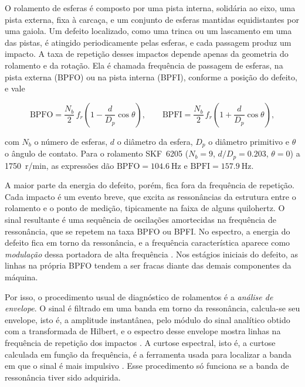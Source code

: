 O rolamento de esferas é composto por uma pista interna, solidária ao eixo, uma pista externa, fixa à carcaça,
e um conjunto de esferas mantidas equidistantes por uma gaiola. Um defeito localizado, como uma trinca ou um
lascamento em uma das pistas, é atingido periodicamente pelas esferas, e cada passagem produz um impacto. A taxa
de repetição desses impactos depende apenas da geometria do rolamento e da rotação. Ela é chamada frequência de
passagem de esferas, na pista externa (BPFO) ou na pista interna (BPFI), conforme a posição do defeito, e vale
\cite{randall2011}

\begin{equation}
\mathrm{BPFO} = \frac{N_b}{2}\, f_r \left(1 - \frac{d}{D_p}\cos\theta\right),
\qquad
\mathrm{BPFI} = \frac{N_b}{2}\, f_r \left(1 + \frac{d}{D_p}\cos\theta\right),
\label{eq:fund-bpfo}
\end{equation}

\noindent
com $N_b$ o número de esferas, $d$ o diâmetro da esfera, $D_p$ o diâmetro primitivo e $\theta$ o ângulo de
contato. Para o rolamento SKF~6205 ($N_b = 9$, $d/D_p = \num{0,203}$, $\theta = 0$) a \SI{1750}{r/min}, as
expressões dão $\mathrm{BPFO} = \SI{104,6}{\hertz}$ e $\mathrm{BPFI} = \SI{157,9}{\hertz}$.

A maior parte da energia do defeito, porém, fica fora da frequência de repetição. Cada impacto é um evento breve,
que excita as ressonâncias da estrutura entre o rolamento e o ponto de medição, tipicamente na faixa de alguns
quilohertz. O sinal resultante é uma sequência de oscilações amortecidas na frequência de ressonância, que se
repetem na taxa BPFO ou BPFI. No espectro, a energia do defeito fica em torno da ressonância, e a frequência
característica aparece como \emph{modulação} dessa portadora de alta frequência \cite{randall2011}. Nos estágios
iniciais do defeito, as linhas na própria BPFO tendem a ser fracas diante das demais componentes da máquina.

Por isso, o procedimento usual de diagnóstico de rolamentos é a \emph{análise de envelope}. O sinal é filtrado em
uma banda em torno da ressonância, calcula-se seu envelope, isto é, a amplitude instantânea, pelo módulo do sinal
analítico obtido com a transformada de Hilbert, e o espectro desse envelope mostra linhas na frequência de repetição
dos impactos \cite{randall2011}. A curtose espectral, isto é, a curtose calculada em função da frequência, é a
ferramenta usada para localizar a banda em que o sinal é mais impulsivo \cite{antoni2007,antoni2006}. Esse
procedimento só funciona se a banda de ressonância tiver sido adquirida.


